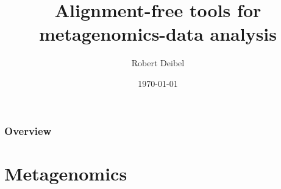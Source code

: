 \documentclass{beamer}
\title[Alignment-free tools]{Alignment-free tools for metagenomics-data analysis } %
\author{Robert Deibel} %
\institute[Universität Tübingen] %
{
Eberhard-Karls Universität Tübingen \\ %
\medskip
\textit{robert.deibel@student.uni-tuebingen.de} %
}
\date{\today} %
\begin{document}
\begin{frame}
\titlepage %
\end{frame}

\begin{frame}
\frametitle{Overview} %
\tableofcontents %
\end{frame}


\section{Metagenomics} %
\end{document}
